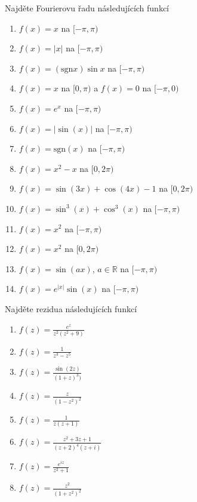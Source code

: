 \begin{multicols}{2}
Najděte Fourierovu řadu následujících funkcí
\begin{enumerate}
\item $f(x) = x$ na $[-\pi,\pi)$
\item $f(x) = | x |$ na $[-\pi,\pi)$
\item $f(x) = (\textrm{sgn} x) \sin x$ na $[-\pi, \pi)$
\item $f(x) = x$ na $[0,\pi)$ a $f(x)=0$ na $[-\pi,0)$
\item $f(x) = e^x$ na $[-\pi, \pi)$
\item $f(x) = |\sin(x)|$ na $[-\pi, \pi)$
\item $f(x) = \textrm{sgn} (x)$ na $[-\pi, \pi)$
\item $f(x) = x^2 - x$ na $[0, 2 \pi)$
\item $f(x) = \sin (3x) + \cos (4x) - 1$ na $[0, 2 \pi)$
\item $f(x) = \sin^3 (x) + \cos^3 (x)$ na $[-\pi, \pi)$
\item $f(x) = x^2$ na $[-\pi, \pi)$
\item $f(x) = x^2$ na $[0, 2 \pi)$
\item $f(x) = \sin (ax)$, $a \in \mathbb{R}$ na $[-\pi, \pi)$
\item $f(x) = e^{|x|} \sin (x)$ na $[-\pi, \pi)$
\end{enumerate}

\separator

Najděte rezidua následujících funkcí
\begin{enumerate}
\item $f(z) = \frac{e^z}{z^2 (z^2 + 9)}$
\item $f(z) = \frac{1}{z^3 - z^5}$
\item $f(z) = \frac{\sin (2z)}{(1+z)^3)}$
\item $f(z) = \frac{z}{\left( 1 - z^2 \right)^2}$
\item $f(z) = \frac{1}{z (z+1)}$
\item $f(z) = \frac{z^2 + 3z + 1}{(z+2)^4 (z+i)}$
\item $f(z) = \frac{e^{iz}}{z^2 + 1}$
\item $f(z)=\frac{z^2}{(1+z^2)^2}$
\end{enumerate}

\separator


\end{multicols}
